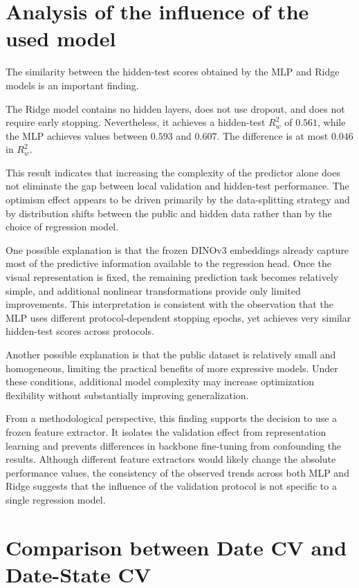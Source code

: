 \section{Analysis of the influence of the used model} 

The similarity between the hidden-test scores obtained by the MLP and Ridge models is an important finding. 

The Ridge model contains no hidden layers, does not use dropout, and does not require early stopping. Nevertheless, it achieves a hidden-test $R^2_w$ of $0.561$, while the MLP achieves values between $0.593$ and $0.607$. The difference is at most $0.046$ in $R^2_w$. 

This result indicates that increasing the complexity of the predictor alone does not eliminate the gap between local validation and hidden-test performance. The optimism effect appears to be driven primarily by the data-splitting strategy and by distribution shifts between the public and hidden data rather than by the choice of regression model. 

One possible explanation is that the frozen DINOv3 embeddings already capture most of the predictive information available to the regression head. Once the visual representation is fixed, the remaining prediction task becomes relatively simple, and additional nonlinear transformations provide only limited improvements. This interpretation is consistent with the observation that the MLP uses different protocol-dependent stopping epochs, yet achieves very similar hidden-test scores across protocols. 

Another possible explanation is that the public dataset is relatively small and homogeneous, limiting the practical benefits of more expressive models. Under these conditions, additional model complexity may increase optimization flexibility without substantially improving generalization. 

From a methodological perspective, this finding supports the decision to use a frozen feature extractor. It isolates the validation effect from representation learning and prevents differences in backbone fine-tuning from confounding the results. Although different feature extractors would likely change the absolute performance values, the consistency of the observed trends across both MLP and Ridge suggests that the influence of the validation protocol is not specific to a single regression model.

\section{Comparison between Date CV and Date-State CV}

